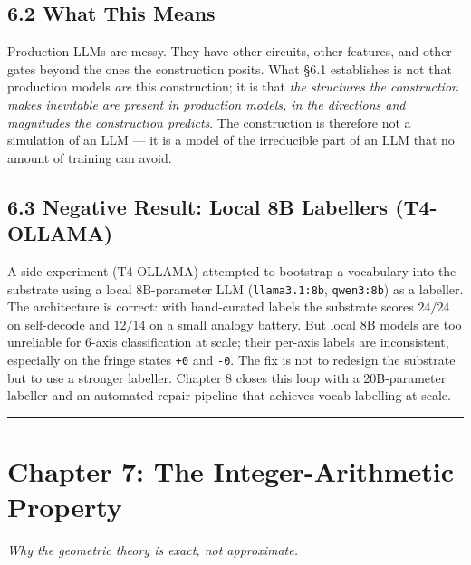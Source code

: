 \documentclass[
  twocolumn,
  10pt,
  a4paper]{article}
\begin{document}
\hypertarget{what-this-means}{%
\subsection{6.2 What This Means}\label{what-this-means}}

Production LLMs are messy. They have other circuits, other features, and
other gates beyond the ones the construction posits. What §6.1
establishes is not that production models \emph{are} this construction;
it is that \emph{the structures the construction makes inevitable are
present in production models, in the directions and magnitudes the
construction predicts}. The construction is therefore not a simulation
of an LLM --- it is a model of the irreducible part of an LLM that no
amount of training can avoid.

\hypertarget{negative-result-local-8b-labellers-t4-ollama}{%
\subsection{6.3 Negative Result: Local 8B Labellers
(T4-OLLAMA)}\label{negative-result-local-8b-labellers-t4-ollama}}

A side experiment (T4-OLLAMA) attempted to bootstrap a vocabulary into
the substrate using a local 8B-parameter LLM (\texttt{llama3.1:8b},
\texttt{qwen3:8b}) as a labeller. The architecture is correct: with
hand-curated labels the substrate scores \(24/24\) on self-decode and
\(12/14\) on a small analogy battery. But local 8B models are too
unreliable for 6-axis classification at scale; their per-axis labels are
inconsistent, especially on the fringe states \texttt{+0} and
\texttt{-0}. The fix is not to redesign the substrate but to use a
stronger labeller. Chapter 8 closes this loop with a 20B-parameter
labeller and an automated repair pipeline that achieves vocab labelling
at scale.

\begin{center}\rule{0.5\linewidth}{0.5pt}\end{center}

\hypertarget{chapter-7-the-integer-arithmetic-property}{%
\FloatBarrier
\section{Chapter 7: The Integer-Arithmetic
Property}\label{chapter-7-the-integer-arithmetic-property}}

\emph{Why the geometric theory is exact, not approximate.}
\end{document}
